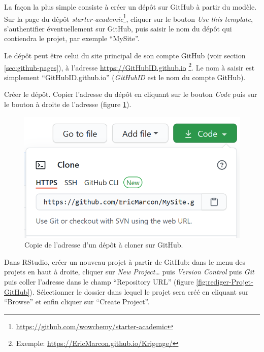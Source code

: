 \documentclass[
  11pt,
  french,
  a4paper,
  extrafontsizes,onecolumn,openright
  ]{memoir}
\begin{document}
La façon la plus simple consiste à créer un dépôt sur GitHub à partir du modèle.
Sur la page du dépôt \emph{starter-academic}\footnote{\url{https://github.com/wowchemy/starter-academic}}, cliquer sur le bouton \emph{Use this template}, s'authentifier éventuellement sur GitHub, puis saisir le nom du dépôt qui contiendra le projet, par exemple ``MySite''.

Le dépôt peut être celui du site principal de son compte GitHub (voir section \ref{sec:github-pages}), à l'adresse \url{https://GitHubID.github.io} \footnote{Exemple: \url{https://EricMarcon.github.io/Krigeage/}}.
Le nom à saisir est simplement ``GitHubID.github.io'' (\emph{GitHubID} est le nom du compte GitHub).

Créer le dépôt.
Copier l'adresse du dépôt en cliquant sur le bouton \emph{Code} puis sur le bouton à droite de l'adresse (figure \ref{fig:rediger-GitHub-Clone}).



\scriptsize

\begin{figure}

{\centering \includegraphics[width=0.8\linewidth]{images/rediger-GitHub-Clone} 

}

\caption{Copie de l'adresse d'un dépôt à cloner sur GitHub.}\label{fig:rediger-GitHub-Clone}
\end{figure}

\normalsize

Dans RStudio, créer un nouveau projet à partir de GitHub: dans le menu des projets en haut à droite, cliquer sur \emph{New Project\ldots{}} puis \emph{Version Control} puis \emph{Git} puis coller l'adresse dans le champ ``Repository URL'' (figure \ref{fig:rediger-Projet-GitHub}).
Sélectionner le dossier dans lequel le projet sera créé en cliquant sur ``Browse'' et enfin cliquer sur ``Create Project''.
\end{document}
